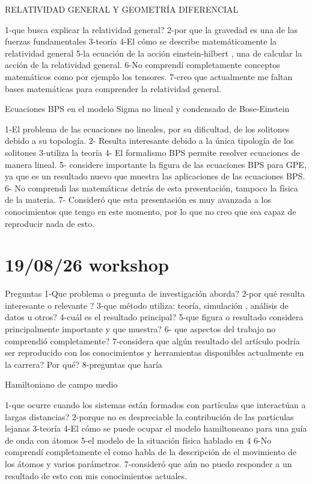 \documentclass{article}
\begin{document}
RELATIVIDAD GENERAL Y GEOMETRÍA DIFERENCIAL

1-que busca explicar la relatividad general?
2-por que la gravedad es  una de las fuerzas fundamentales
3-teoría
4-El cómo se describe matemáticamente la relatividad general
5-la ecuación de la acción einstein-hilbert , una de calcular la acción de la relatividad general.
6-No comprendí completamente conceptos matemáticos como por ejemplo los tensores.
7-creo que actualmente me faltan bases matemáticas para comprender la relatividad general.


Ecuaciones BPS en el modelo Sigma no lineal y condensado de Bose-Einstein

1-El problema de las ecuaciones no lineales, por su dificultad, de los solitones debido a su topología.
2- Resulta interesante debido a la única tipología de los solitones
3-utiliza la teoría
4- El formalismo BPS permite resolver ecuaciones de manera lineal.
5- considere importante la figura de las ecuaciones BPS para GPE, ya que es un resultado nuevo que muestra las aplicaciones de las ecuaciones BPS.
6- No comprendi las matemáticas detrás de esta presentación, tampoco la física de la materia.
7- Consideró que esta presentación es muy avanzada a los conocimientos que tengo en este momento, por lo que no creo que sea capaz de reproducir nada de esto.


\section{19/08/26 workshop}

Preguntas
1-Que problema o pregunta de investigación aborda?
2-por qué resulta interesante o relevante ?
3-que método utiliza: teoría, simulación , análisis de datos u otros?
4-cuál es el resultado principal?
5-que figura o resultado considera principalmente importante y que muestra?
6- que aspectos del trabajo no comprendió completamente?
7-considera que algún resultado del artículo podría ser reproducido con los conocimientos y herramientas disponibles actualmente en la carrera? Por qué?
8-preguntas que haría 









Hamiltoniano de campo medio

1-que ocurre cuando los sistemas están formados con partículas que interactúan a largas distancias?
2-porque no es despreciable la contribución de las partículas lejanas
3-teoría
4-El cómo se puede ocupar el modelo hamiltoneano para una guía de onda con átomos
5-el modelo de la situación física  hablado en 4
6-No comprendí completamente el como habla de la descripción de el movimiento de los átomos y varios parámetros.
7-consideró que aún no puedo responder a un resultado de esto con mis conocimientos actuales.
\end{document}
